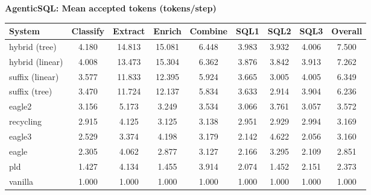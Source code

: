 \textbf{AgenticSQL: Mean accepted tokens (tokens/step)}
\begin{table}[H]
\begin{adjustbox}{width=\linewidth}
\centering
\begin{tabular}{lcccccccc}
\toprule
\textbf{System} & Classify & Extract & Enrich & Combine & SQL1 & SQL2 & SQL3 & \textbf{Overall} \\
\midrule
hybrid (tree) & 4.180 & 14.813 & 15.081 & 6.448 & 3.983 & 3.932 & 4.006 & 7.500 \\
hybrid (linear) & 4.008 & 13.473 & 15.304 & 6.362 & 3.876 & 3.842 & 3.913 & 7.262 \\
suffix (linear) & 3.577 & 11.833 & 12.395 & 5.924 & 3.665 & 3.005 & 4.005 & 6.349 \\
suffix (tree) & 3.470 & 11.724 & 12.137 & 5.834 & 3.633 & 2.914 & 3.904 & 6.236 \\
eagle2 & 3.156 & 5.173 & 3.249 & 3.534 & 3.066 & 3.761 & 3.057 & 3.572 \\
recycling & 2.915 & 4.125 & 3.125 & 3.138 & 2.951 & 2.929 & 2.994 & 3.169 \\
eagle3 & 2.529 & 3.374 & 4.198 & 3.179 & 2.142 & 4.622 & 2.056 & 3.160 \\
eagle & 2.305 & 4.062 & 2.877 & 3.127 & 2.166 & 3.295 & 2.109 & 2.851 \\
pld & 1.427 & 4.134 & 1.455 & 3.914 & 2.074 & 1.452 & 2.151 & 2.373 \\
vanilla & 1.000 & 1.000 & 1.000 & 1.000 & 1.000 & 1.000 & 1.000 & 1.000 \\
\bottomrule
\end{tabular}
\end{adjustbox}
\end{table}

